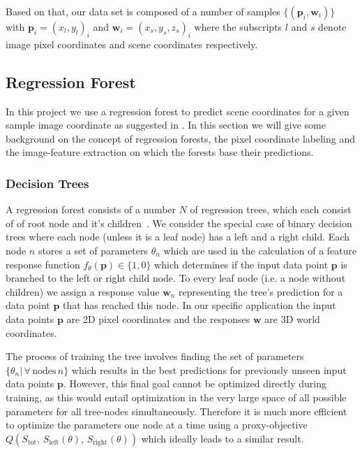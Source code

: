 \documentclass[final]{cvpr}
\begin{document}
Based on that, our data set is composed of a number of samples $\{(\boldsymbol{p}_i, \boldsymbol{w}_i)\}$ with
$\boldsymbol{p}_i = (x_l, y_l)_i$ and $\boldsymbol{w}_i = (x_s, y_s, z_s)_i$ where the subscripts
$l$ and $s$ denote image pixel coordinates and scene coordinates respectively.\\

\subsection{Regression Forest}

In this project we use a regression forest to predict scene coordinates for a given
sample image coordinate as suggested in \cite{shotton2013}. In this section we will
give some background on the concept of regression forests, the pixel coordinate
labeling and the image-feature extraction on which the forests base their predictions.\\

\subsubsection{Decision Trees}
A regression forest consists of a number $N$ of regression trees, which each consist of
of root node and it's children~\cite{Criminisi2013}. We consider the special case of binary decision trees
where each node (unless it is a leaf node) has a left and a right child. Each node $n$
stores a set of parameters $\theta_n$ which are used in the calculation of a
feature response function $f_{\theta}(\boldsymbol{p}) \in \{1, 0\}$ which determines if the input
data point $\boldsymbol{p}$ is branched to the left or right child node. To every leaf node
(i.e. a node without children) we assign a response value $\boldsymbol{w}_n$ representing
the tree's prediction for a data point $\boldsymbol{p}$ that has reached this node. In our
specific application the input data points $\boldsymbol{p}$ are 2D pixel coordinates and the
responses $\boldsymbol{w}$ are 3D world coordinates.

The process of training the tree involves finding the set of parameters
$\{\theta_n | \, \forall \, \text{nodes} \, n\}$ which results in the best predictions
for previously unseen input data points $\boldsymbol{p}$. However, this final goal cannot
be optimized directly during training, as this would entail optimization in the
very large space of all possible parameters for all tree-nodes simultaneously. Therefore
it is much more efficient to optimize the parameters one node at a time using a
proxy-objective $Q(S_{\text{tot}},\, S_{\text{left}}(\theta),\, S_{\text{right}}(\theta))$
which ideally leads to a similar result.
\end{document}
